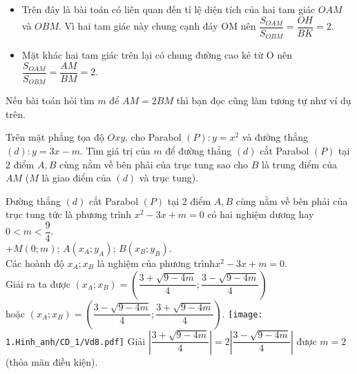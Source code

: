 \begin{cy}
	\begin{itemize}
		\item Trên đây là bài toán có liên quan đến tỉ lệ diện tích của hai tam giác $OAM$ và $OBM$. Vì hai tam giác này chung cạnh đáy OM nên $\dfrac{{{S}_{OAM}}}{{{S}_{OBM}}}=\dfrac{OH}{BK}=2$.
		\item Mặt khác hai tam giác trên lại có chung đường cao kẻ từ O nên $\dfrac{{{S}_{OAM}}}{{{S}_{OBM}}}=\dfrac{AM}{BM}=2$.
	\end{itemize}
	Nếu bài toán hỏi tìm $m$ để $AM=2BM$ thì bạn đọc cũng làm tương tự như ví dụ trên.	
\end{cy}
\begin{vd}
	Trên mặt phẳng tọa độ $Oxy$, cho Parabol $(P)\colon y={{x}^{2}}$ và đường thẳng $( d)\colon y=3x-m$. Tìm giá trị của $m$ để đường thẳng $\left( d \right)$ cắt Parabol $\left( P \right)$ tại 2 điểm $A,B$ cùng nằm về bên phải của trục tung sao cho $B$ là trung điểm của $AM$  ($M$ là giao điểm của $\left( d \right)$ và trục tung).
\end{vd}
\begin{dapan}
	Đường thẳng $\left( d \right)$ cắt Parabol $\left( P \right)$ tại 2 điểm $A,B$ cùng nằm về bên phải của trục tung tức là phương trình ${{x}^{2}}-3x+m=0$ có hai nghiệm dương hay $0<m<\dfrac{9}{4}$.\\
	+$M\left( 0;m \right)$; $A\left( {{x}_{A}};{{y}_{A}} \right)$; $B\left( {{x}_{B}};{{y}_{B}} \right)$.\\
	Các hoành độ ${{x}_{A}};{{x}_{B}}$ là nghiệm của phương trình${{x}^{2}}-3x+m=0$.\\
	Giải ra ta được $\left( {{x}_{A}};{{x}_{B}} \right)=\left( \dfrac{3+\sqrt{9-4m}}{4};\dfrac{3-\sqrt{9-4m}}{4} \right)$ \\
	hoặc $\left( {{x}_{A}};{{x}_{B}} \right)=\left( \dfrac{3-\sqrt{9-4m}}{4};\dfrac{3+\sqrt{9-4m}}{4} \right)$.
	\vspace{-0.5cm}
	{
		\texttt{[image: 1.Hinh\_anh/CD\_1/Vd8.pdf]}
	}
	Giải $\left| \dfrac{3+\sqrt{9-4m}}{4} \right|=2\left| \dfrac{3-\sqrt{9-4m}}{4} \right|$ được $m=2$ (thỏa mãn điều kiện).
\end{dapan}

